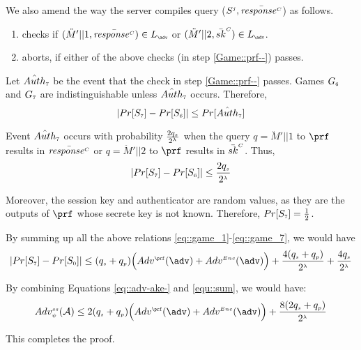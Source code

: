 \begin{itemize}
We also amend the way the server compiles query \send($S^{\scriptscriptstyle  j},   \bar{\mathit{response}^{\scriptscriptstyle C}}$) as follows. 
%
\begin{enumerate}[label=\alph*]
%
\item\label{Game::prf--}  checks if  $(\ddot M'||1, \bar{\VC{\mathit{response}}})\in L_{\sss \adv}$ or  $(\ddot M'||2, \bar {sk}^{\sss C})\in L_{\sss \adv}$. 
%
\item aborts, if either of the above checks (in step \ref{Game::prf--}) passes.
%
\end{enumerate}



 Let $\hat {Auth}_{\scriptscriptstyle  7}$ be the event that the check in step \ref{Game::prf--} passes. Games $G_{\scriptscriptstyle  6}$ and $G_{\scriptscriptstyle 7}$ are indistinguishable unless $\hat {Auth}_{\scriptscriptstyle  7}$ occurs. Therefore,
%
$$|Pr[S_{\scriptscriptstyle  7}]-Pr[S_{\scriptscriptstyle  6}]|\leq Pr[\hat {Auth}_{\scriptscriptstyle  7}]$$


Event $\hat {Auth}_{\scriptscriptstyle  7}$ occurs with probability $ \frac{2q_{\scriptscriptstyle  s}}{2^{\scriptscriptstyle \lambda}}$ when the query $q=\ddot M'||1$ to $\prf$ results in $\bar{\mathit{response}^{\scriptscriptstyle C}}$ or $q=\ddot M'||2$ to $\prf$ results in $\bar {sk}^{\scriptscriptstyle C}$. Thus, 
%
\begin{equation}\label{eq::game_7}
|Pr[S_{\scriptscriptstyle  7}]-Pr[S_{\scriptscriptstyle  6}]|\leq \frac{2q_{\scriptscriptstyle  s}}{2^{\scriptscriptstyle \lambda}}
\end{equation}

Moreover, the session key and authenticator are random values, as they are the outputs of $\prf$ whose secrete key is not known. Therefore, $Pr[S_{\scriptscriptstyle  7}]=\frac{1}{2}$. 



By summing up all the above relations \ref{eq::game_1}-\ref{eq::game_7}, we would have 
%
\begin{equation}\label{equ::sum}
|Pr[S_{\sss  7}]-Pr[S_{\sss  0}]|\leq (q_{\sss s}+q_{\sss p})\Big(Adv^{\sss\prf}(\adv)+Adv^{\sss Enc}(\adv)\Big)+\frac{4(q_{\sss  s}+q_{\sss  p})}{2^{\sss \lambda}}+\frac{4q_{\sss  s}}{2^{\sss \lambda}}
\end{equation}

By combining Equations \ref{eq::adv-ake-} and \ref{equ::sum}, we would have: 
%
\begin{equation*} 
Adv_{\sss  \psi}^{\sss  ss}(\A) \leq 2(q_{\sss s}+q_{\sss p})\Big(Adv^{\sss\prf}(\adv)+Adv^{\sss Enc}(\adv)\Big)+\frac{8(2q_{\sss  s}+q_{\sss  p})}{2^{\sss \lambda}}
\end{equation*}

This completes the proof. 


%

 

\end{itemize}

